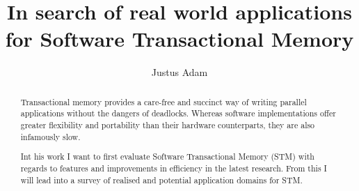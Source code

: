 \documentclass[11pt,a4paper,sigconf]{acmart}
\begin{document}
\title{In search of real world applications for Software Transactional Memory}

\author{Justus Adam}


\begin{abstract}
  Transactional memory provides a care-free and succinct way of writing parallel
  applications without the dangers of deadlocks. Whereas software
  implementations offer greater flexibility and portability than their hardware
  counterparts, they are also infamously slow.

  Int his work I want to first evaluate Software Transactional Memory (STM) with
  regards to features and improvements in efficiency in the latest research.
  From this I will lead into a survey of realised and potential application
  domains for STM.
\end{abstract}

\maketitle






\end{document}
